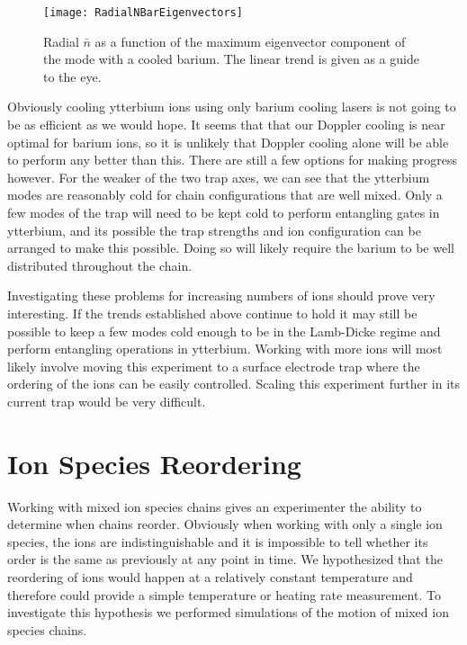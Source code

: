 \begin{figure}
	\centering
	\texttt{[image: RadialNBarEigenvectors]}
	\caption[Radial mode occupation numbers for different barium ion motional couplings]{Radial $\bar{n}$ as a function of the maximum eigenvector component of the mode with a cooled barium.  The linear trend is given as a guide to the eye.}
	\label{radial-nbars}
\end{figure}

Obviously cooling ytterbium ions using only barium cooling lasers is not going to be as efficient as we would hope.  It seems that that our Doppler cooling is near optimal for barium ions, so it is unlikely that Doppler cooling alone will be able to perform any better than this.  There are still a few options for making progress however.  For the weaker of the two trap axes, we can see that the ytterbium modes are reasonably cold for chain configurations that are well mixed.  Only a few modes of the trap will need to be kept cold to perform entangling gates in ytterbium, and its possible the trap strengths and ion configuration can be arranged to make this possible.  Doing so will likely require the barium to be well distributed throughout the chain.

Investigating these problems for increasing numbers of ions should prove very interesting.  If the trends established above continue to hold it may still be possible to keep a few modes cold enough to be in the Lamb-Dicke regime and perform entangling operations in ytterbium.  Working with more ions will most likely involve moving this experiment to a surface electrode trap where the ordering of the ions can be easily controlled.  Scaling this experiment further in its current trap would be very difficult.

\section{Ion Species Reordering}
\label{sec:reordering}

Working with mixed ion species chains gives an experimenter the ability to determine when chains reorder.  Obviously when working with only a single ion species, the ions are indistinguishable and it is impossible to tell whether its order is the same as previously at any point in time.  We hypothesized that the reordering of ions would happen at a relatively constant temperature and therefore could provide a simple temperature or heating rate measurement.  To investigate this hypothesis we performed simulations of the motion of mixed ion species chains.

